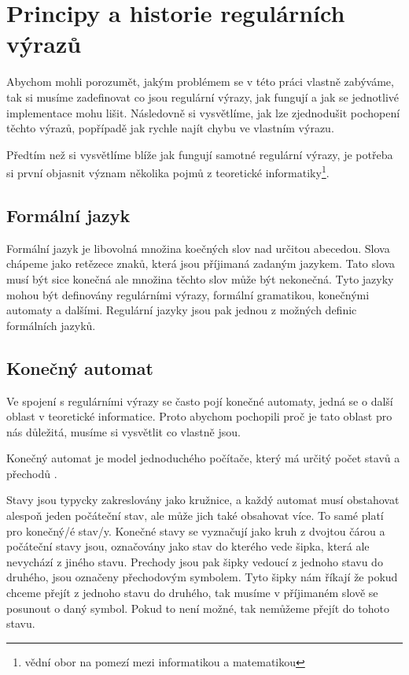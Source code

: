 \chapter{Principy a historie regulárních výrazů}\label{sec:Principle}

Abychom mohli porozumět, jakým problémem se v této práci vlastně zabýváme, tak si musíme zadefinovat co jsou
regulární výrazy, jak fungují a jak se jednotlivé implementace mohu lišit. Následovně si vysvětlíme, jak lze zjednodušit
pochopení těchto výrazů, popřípadě jak rychle najít chybu ve vlastním výrazu. 

Předtím než si vysvětlíme blíže jak fungují samotné regulární výrazy, je potřeba si první objasnit význam několika pojmů z teoretické informatiky\footnote{vědní obor na pomezí mezi informatikou a matematikou}.

\section{Formální jazyk}
Formální jazyk je libovolná množina koečných slov nad určitou abecedou. 
Slova chápeme jako retězece znaků, která jsou příjimaná zadaným jazykem.
Tato slova musí být sice konečná ale množina těchto slov může být nekonečná. 
Tyto jazyky mohou být definovány regulárními výrazy, formální gramatikou,
konečnými automaty a dalšími. Regulární jazyky jsou pak jednou z možných definic formálních jazyků.

\section{Konečný automat}
Ve spojení s regulárními výrazy se často pojí konečné automaty, jedná se o další oblast v teoretické informatice.
Proto abychom pochopili proč je tato oblast pro nás důležitá, musíme si vysvětlit co vlastně jsou.

Konečný automat je model jednoduchého počítače, který má určitý počet stavů a přechodů \cite{Havrlant}. 

Stavy jsou typycky zakreslovány jako kružnice, a každý automat musí obstahovat alespoň jeden počáteční stav,
ale může jich také obsahovat více. To samé platí pro konečný/é stav/y. Konečné stavy se vyznačují jako kruh z dvojtou čárou a počáteční stavy jsou, 
označovány jako stav do kterého vede šipka, která ale nevychází z jiného stavu.
Prechody jsou pak šipky vedoucí z jednoho stavu do druhého, jsou označeny přechodovým symbolem.
Tyto šipky nám říkají že pokud chceme přejít z jednoho stavu do druhého, tak musíme v příjimaném slově se posunout o
daný symbol. Pokud to není možné, tak nemůžeme přejít do tohoto stavu.

